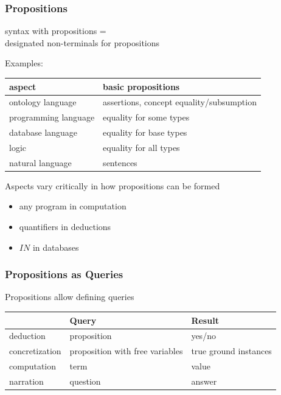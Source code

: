 \begin{frame}\frametitle{Propositions}
syntax with propositions = \\
designated non-terminals for propositions
\medskip

Examples:
\begin{center}
\footnotesize
\begin{tabular}{l|l}
aspect & basic propositions\\
\hline
ontology language & assertions, concept equality/subsumption\\
programming language & equality for some types\\
database language & equality for base types \\
logic & equality for all types\\
natural language & sentences \\
\end{tabular}
\end{center}

Aspects vary critically in how propositions can be formed
\begin{itemize}
\item any program in computation
\item quantifiers in deductions 
\item $IN$ in databases
\end{itemize}
\end{frame}

\begin{frame}\frametitle{Propositions as Queries}
Propositions allow defining queries

\begin{center}
\footnotesize
\begin{tabular}{l|ll}
& Query & Result\\
\hline
deduction & proposition & yes/no \\
concretization & proposition with free variables & true ground instances \\
computation & term & value \\
narration & question & answer \\
\end{tabular}
\end{center}
\end{frame}

